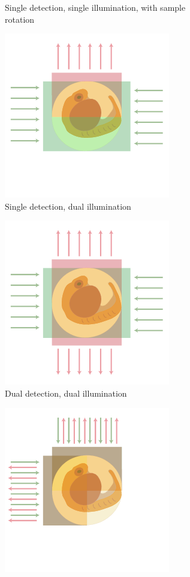 \begin{figure}
\begin{subfigure}[t]{0.4\textwidth}
        \caption{Single detection, single illumination, with sample rotation~\cite{huisken_optical_2004}}\label{fig:depth/spin_spim}
    \end{subfigure}
    \begin{subfigure}[t]{0.4\textwidth}
        \centering
        \includegraphics{depth/dual_illumination}
        \caption{Single detection, dual illumination~}\label{fig:depth/dual_illumination}
    \end{subfigure}\hspace{0.07\textwidth}
    \begin{subfigure}[t]{0.4\textwidth}
        \centering
        \includegraphics{depth/multiview}
        \caption{Dual detection, dual illumination~\cite{krzicMultiviewLightsheetMicroscope2012}}\label{fig:depth/multiview}
    \end{subfigure}
    \begin{subfigure}[t]{0.4\textwidth}
        \centering
        \includegraphics{depth/di_spim}

\end{subfigure}
\end{figure}
